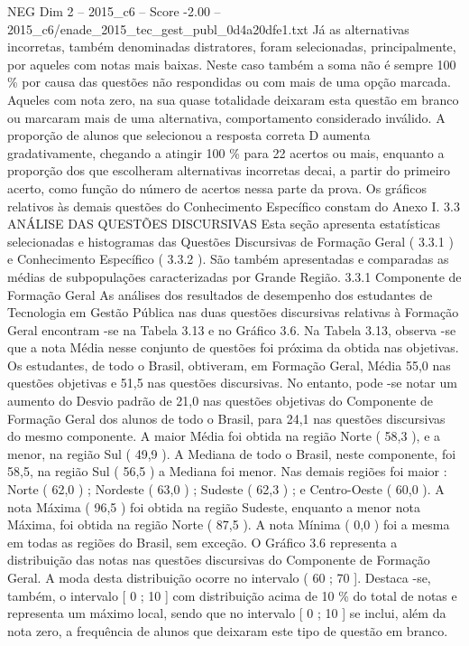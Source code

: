 \begin{textsample}{NEG Dim 2 – 2015\_c6 – Score -2.00 – 2015\_c6/enade\_2015\_tec\_gest\_publ\_0d4a20dfe1.txt}
Já as alternativas incorretas, também denominadas distratores, foram selecionadas, principalmente, por aqueles com notas mais baixas.
Neste caso também a soma não é sempre 100 \% por causa das questões não respondidas ou com mais de uma opção marcada.
Aqueles com nota zero, na sua quase totalidade deixaram esta questão em branco ou marcaram mais de uma alternativa, comportamento considerado inválido.
A proporção de alunos que selecionou a resposta correta D aumenta gradativamente, chegando a atingir 100 \% para 22 acertos ou mais, enquanto a proporção dos que escolheram alternativas incorretas decai, a partir do primeiro acerto, como função do número de acertos nessa parte da prova.
Os gráficos relativos às demais questões do Conhecimento Específico constam do Anexo I. 3.3 ANÁLISE DAS QUESTÕES DISCURSIVAS Esta seção apresenta estatísticas selecionadas e histogramas das Questões Discursivas de Formação Geral ( 3.3.1 ) e Conhecimento Específico ( 3.3.2 ).
São também apresentadas e comparadas as médias de subpopulações caracterizadas por Grande Região. 3.3.1 Componente de Formação Geral As análises dos resultados de desempenho dos estudantes de Tecnologia em Gestão Pública nas duas questões discursivas relativas à Formação Geral encontram -se na Tabela 3.13 e no Gráfico 3.6.
Na Tabela 3.13, observa -se que a nota Média nesse conjunto de questões foi próxima da obtida nas objetivas.
Os estudantes, de todo o Brasil, obtiveram, em Formação Geral, Média 55,0 nas questões objetivas e 51,5 nas questões discursivas.
No entanto, pode -se notar um aumento do Desvio padrão de 21,0 nas questões objetivas do Componente de Formação Geral dos alunos de todo o Brasil, para 24,1 nas questões discursivas do mesmo componente.
A maior Média foi obtida na região Norte ( 58,3 ), e a menor, na região Sul ( 49,9 ).
A Mediana de todo o Brasil, neste componente, foi 58,5, na região Sul ( 56,5 ) a Mediana foi menor.
Nas demais regiões foi maior : Norte ( 62,0 ) ; Nordeste ( 63,0 ) ; Sudeste ( 62,3 ) ; e Centro-Oeste ( 60,0 ).
A nota Máxima ( 96,5 ) foi obtida na região Sudeste, enquanto a menor nota Máxima, foi obtida na região Norte ( 87,5 ).
A nota Mínima ( 0,0 ) foi a mesma em todas as regiões do Brasil, sem exceção.
O Gráfico 3.6 representa a distribuição das notas nas questões discursivas do Componente de Formação Geral.
A moda desta distribuição ocorre no intervalo ( 60 ; 70 ].
Destaca -se, também, o intervalo [ 0 ; 10 ] com distribuição acima de 10 \% do total de notas e representa um máximo local, sendo que no intervalo [ 0 ; 10 ] se inclui, além da nota zero, a frequência de alunos que deixaram este tipo de questão em branco.

\end{textsample}
